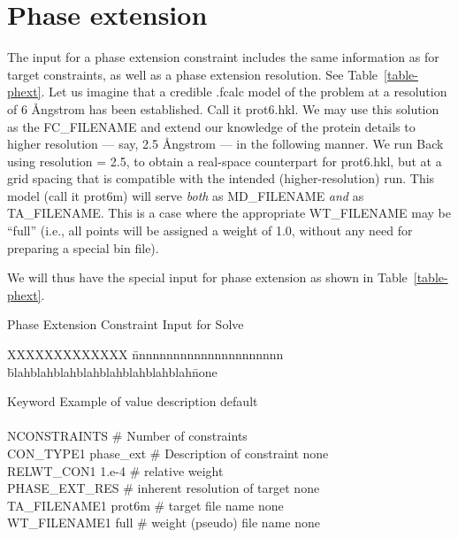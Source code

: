 \documentclass{report}
\begin{document}
{\section {Phase extension}
\label{phase_ext}

The input for a phase extension constraint includes the same information
as for target constraints, as well as a phase extension resolution.  See
Table~\ref{table-phext}.
Let us imagine that a credible .fcalc model of the problem 
at a resolution of 6 \AA ngstrom has been established.  Call it
prot6.hkl.  We may use this solution as the 
FC\_FILENAME and extend our 
knowledge of the protein details to higher resolution --- say, 
2.5 \AA ngstrom --- in the following manner.  
We run Back using resolution = 2.5, to obtain a 
real-space counterpart for prot6.hkl, but at a grid spacing that is compatible
with the intended (higher-resolution) run.  This model (call it prot6m) will 
serve {\em both} as MD\_FILENAME 
{\em and} as TA\_FILENAME.  
This is a case where the appropriate WT\_FILENAME
may be ``full'' (i.e., all points will be assigned a weight of 1.0, without
any need for preparing a special bin file).

We will thus have the special input for phase extension as shown in 
Table~\ref{table-phext}.

\begin{table} [htb]
\caption {\large Phase Extension Constraint Input for Solve}
\label{table-phext}

\begin{tabbing}
XXXXXXXXXXXXX \= nnnnnnnnnnnnnnnnnnnnnn \= 
blahblahblahblahblahblahblahblah\= none \kill

Keyword \> Example of value \> description \> default \\
\\
NCONSTRAINTS  \> \# Number of constraints  \\
CON\_TYPE1 \> phase\_ext \> \# Description of constraint \> none \\
RELWT\_CON1 \> 1.e-4 \> \# relative weight   \\
PHASE\_EXT\_RES  \> \# inherent resolution of target \> none \\
TA\_FILENAME1 \> prot6m \> \# target file name \> none \\
WT\_FILENAME1 \> full \> \# weight (pseudo) file name \> none \\
\end{tabbing} 
\end{table}

}
\end{document}
